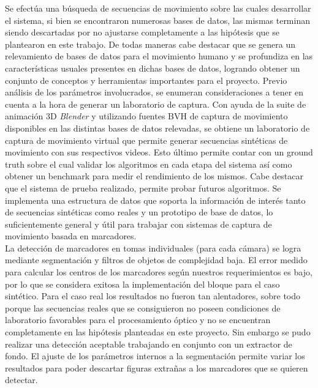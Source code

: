 Se efectúa una búsqueda de secuencias de movimiento sobre las cuales desarrollar el sistema, si bien se encontraron numerosas bases de datos, las mismas terminan siendo descartadas por no ajustarse completamente  a las hipótesis que se plantearon en este trabajo. De todas maneras cabe destacar que se genera un relevamiento de bases de datos para el movimiento humano y se profundiza en las características usuales presentes en dichas bases de datos, logrando obtener un conjunto de conceptos y herramientas importantes para el proyecto. Previo análisis de los parámetros involucrados, se enumeran consideraciones a tener en cuenta a la hora de generar un laboratorio de captura.
Con ayuda de la suite de animación 3D \emph{Blender} y utilizando fuentes BVH de captura de movimiento disponibles en las distintas bases de datos relevadas, se obtiene un laboratorio de captura de movimiento virtual que permite generar secuencias sintéticas de movimiento con sus respectivos videos. Esto último permite contar con un ground truth sobre el cual validar los algoritmos en cada etapa del sistema así como obtener un benchmark para medir el rendimiento de los mismos. Cabe destacar que el sistema de prueba realizado, permite probar futuros algoritmos.
Se implementa una estructura de datos que soporta la información de interés tanto de secuencias sintéticas como reales y un prototipo de base de datos, lo suficientemente general y útil para trabajar con sistemas de captura de movimiento basada en marcadores.\\ 


La detección de marcadores en tomas individuales (para cada cámara) se logra mediante segmentación y filtros de objetos de complejidad baja. El error medido para calcular los centros de los marcadores según nuestros requerimientos es bajo, por lo que se considera exitosa la implementación del bloque para el caso sintético. Para el caso real los resultados no fueron tan alentadores, sobre todo porque las secuencias reales que se consiguieron no poseen condiciones de laboratorio favorables para el procesamiento óptico y no se encuentran completamente en las hipótesis planteadas en este proyecto. Sin embargo se pudo realizar una detección aceptable trabajando en conjunto con un extractor de fondo. El ajuste de los parámetros internos a la segmentación permite variar los resultados para poder descartar figuras extrañas a los marcadores que se quieren detectar.\\ 

